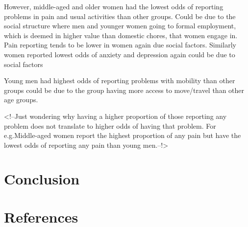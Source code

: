 \documentclass[
]{article}
\begin{document}
However, middle-aged and older women had the lowest odds of reporting
problems in pain and usual activities than other groups. Could be due to
the social structure where men and younger women going to formal
employment, which is deemed in higher value than domestic chores, that
women engage in. Pain reporting tends to be lower in women again due
social factors. Similarly women reported lowest odds of anxiety and
depression again could be due to social factors

Young men had highest odds of reporting problems with mobility than
other groups could be due to the group having more access to move/travel
than other age groups.

\textless!--Just wondering why having a higher proportion of those
reporting any problem does not translate to higher odds of having that
problem. For e.g.Middle-aged women report the highest proportion of any
pain but have the lowest odds of reporting any pain than young
men.--!\textgreater{}

\hypertarget{conclusion}{%
\section{Conclusion}\label{conclusion}}

\hypertarget{references}{%
\section{References}\label{references}}
\end{document}
